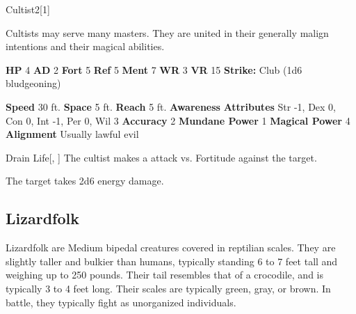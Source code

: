   \begin{monsection}{Cultist}{2}[1]
    \vspace{-1em}\vspace{-1em}
    \vspace{0em}

    
        Cultists may serve many masters.
        They are united in their generally malign intentions and their magical abilities.
      

    \begin{spellcontent}
      \begin{spelltargetinginfo}
        \pari \textbf{HP} 4 \monsep
          \textbf{AD} 2 \monsep
          \textbf{Fort} 5 \monsep
          \textbf{Ref} 5 \monsep
          \textbf{Ment} 7
        \pari \textbf{WR} 3 \monsep
        \textbf{VR} 15
        \pari \textbf{Strike:}
            Club  (1d6 bludgeoning)
      \end{spelltargetinginfo}
    \end{spellcontent}
    \begin{monsterfooter}
      \pari \textbf{Speed} 30 ft. \monsep
        \textbf{Space} 5 ft. \monsep
        \textbf{Reach} 5 ft.
      \pari \textbf{Awareness} 
      \pari \textbf{Attributes}
        Str -1, Dex 0,
        Con 0, Int -1,
        Per 0, Wil 3
      \pari \textbf{Accuracy} 2 \monsep
        \textbf{Mundane Power} 1 \monsep
      \textbf{Magical Power} 4
      \pari \textbf{Alignment} Usually lawful evil
    \end{monsterfooter}
  \end{monsection}
  \begin{freeability}{Drain Life}[, ]
       The cultist makes a  attack
        vs. Fortitude against the target.
    
    \hit The target takes 2d6 energy damage.
    \end{freeability}
  
    \subsection{Lizardfolk}
      
      Lizardfolk are Medium bipedal creatures covered in reptilian scales.
      They are slightly taller and bulkier than humans, typically standing 6 to 7 feet tall and weighing up to 250 pounds.
      Their tail resembles that of a crocodile, and is typically 3 to 4 feet long.
      Their scales are typically green, gray, or brown.
      In battle, they typically fight as unorganized individuals.
    
